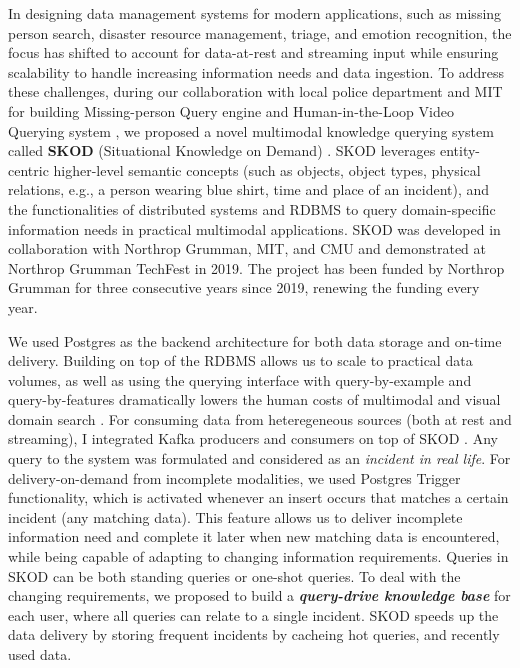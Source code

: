 %
In designing data management systems for modern applications, such as missing person search, disaster resource management, triage, and emotion recognition, the focus has shifted to account for data-at-rest and streaming input while ensuring scalability to handle increasing information needs and data ingestion. To address these challenges, 
during our collaboration with local police department and MIT for building Missing-person Query engine \cite{solaiman2021applying} and Human-in-the-Loop Video Querying system \cite{stonebraker2020surveillance}, we proposed a novel multimodal knowledge querying system called \textbf{SKOD} (Situational Knowledge on Demand) \cite{palacios2019wip, stonebraker2020surveillance}. SKOD leverages entity-centric higher-level semantic concepts
(such as objects, object types, physical relations, e.g., a person wearing blue shirt, time and place of  an incident),  
and the functionalities of distributed systems and RDBMS
to query domain-specific information needs in practical multimodal applications. SKOD was developed in collaboration with Northrop Grumman, MIT, and CMU and demonstrated at Northrop Grumman TechFest in 2019. The project has been funded by Northrop Grumman for three consecutive years since 2019, renewing the funding every year.


    We used Postgres as the backend architecture  for both data storage and on-time delivery. 
    Building on top of the RDBMS allows us to scale to practical data %
    volumes, as well as using the querying interface with query-by-example and query-by-features dramatically lowers the human costs of 
    multimodal and visual domain search \cite{stonebraker2020surveillance}.
    For consuming data from heteregeneous sources (both at rest and streaming), I integrated Kafka producers and consumers on top of SKOD \cite{palacios2019wip}. 
    Any query to the system was formulated and considered as an \textit{incident in real life}.
    For delivery-on-demand from incomplete modalities, we used Postgres Trigger functionality, which 
    is activated whenever an insert occurs that matches a certain incident (any matching data). 
    This feature allows us to deliver incomplete 
    information need %
    and complete it later when new matching data is encountered, while being capable of adapting to changing information requirements. Queries in SKOD can be both standing queries or one-shot queries. To deal with the changing requirements, we proposed to build a \textit{\textbf{query-drive knowledge base}} for each user, where all queries can relate to a single incident. SKOD speeds up the data delivery by storing frequent incidents by cacheing hot queries, and recently used data.


